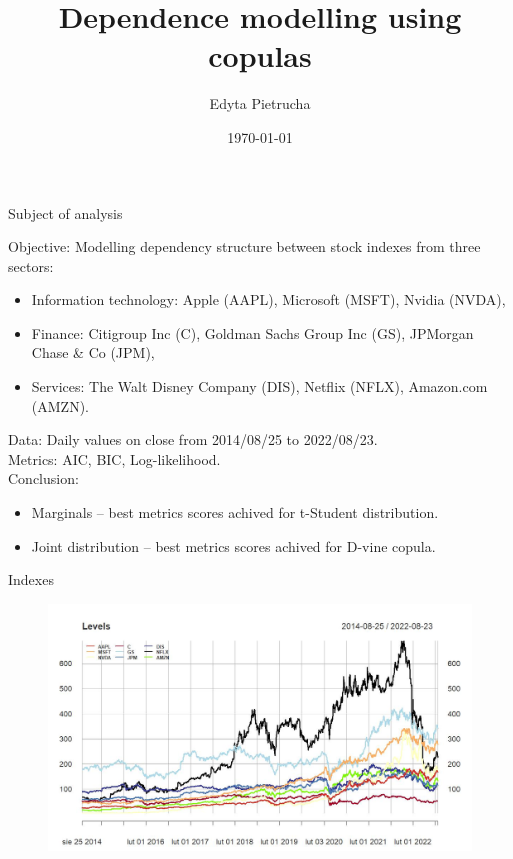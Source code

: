 \documentclass{beamer}
\title{Dependence modelling using copulas}
\author{Edyta Pietrucha}
\date{\today}
\begin{document}
\begin{frame}
\titlepage 
\end{frame}

\begin{frame}{Subject of analysis}

\fontsize{10}{13}\selectfont
Objective: Modelling dependency structure between stock indexes from three sectors:
\begin{itemize}
    \item Information technology: Apple (AAPL), Microsoft (MSFT), Nvidia (NVDA),
    \item Finance: Citigroup Inc (C), Goldman Sachs Group Inc (GS), JPMorgan Chase \& Co (JPM),
    \item Services: The Walt Disney Company (DIS), Netflix (NFLX), Amazon.com (AMZN).
\end{itemize}
Data: Daily values on close from 2014/08/25 to 2022/08/23. \\
Metrics: AIC, BIC, Log-likelihood. \\
Conclusion: 
\begin{itemize}
    \item Marginals -- best metrics scores achived for t-Student distribution.
    \item Joint distribution -- best metrics scores achived for D-vine copula.
\end{itemize}
    
\end{frame}

\begin{frame}{Indexes}

\centering
\begin{figure}[!h]
  \centering
    \includegraphics[width=1\textwidth]{figures/indexes_lvls.jpeg}
\end{figure}
    
\end{frame}
\end{document}
